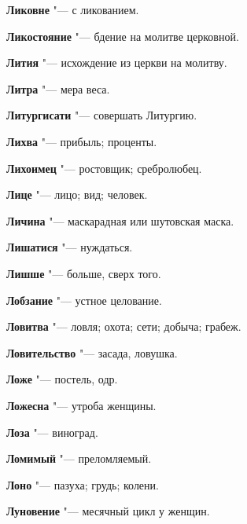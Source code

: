 \begin{mymulticols}{2}
\noindent\textbf{Ликовне} "--- с ликованием. 




\noindent\textbf{Ликостояние} "--- бдение на молитве церковной. 




\noindent\textbf{Лития} "--- исхождение из церкви на молитву. 




\noindent\textbf{Литра} "--- мера веса. 




\noindent\textbf{Литургисати} "--- совершать Литургию. 




\noindent\textbf{Лихва} "--- прибыль; проценты. 




\noindent\textbf{Лихоимец} "--- ростовщик; сребролюбец. 




\noindent\textbf{Лице} "--- лицо; вид; человек. 




\noindent\textbf{Личина} "--- маскарадная или шутовская маска. 




\noindent\textbf{Лишатися} "--- нуждаться. 




\noindent\textbf{Лишше} "--- больше, сверх того. 




\noindent\textbf{Лобзание} "--- устное целование. 




\noindent\textbf{Ловитва} "--- ловля; охота; сети; добыча; грабеж. 




\noindent\textbf{Ловительство} "--- засада, ловушка. 




\noindent\textbf{Ложе} "--- постель, одр. 




\noindent\textbf{Ложесна} "--- утроба женщины. 




\noindent\textbf{Лоза} "--- виноград. 




\noindent\textbf{Ломимый} "--- преломляемый. 




\noindent\textbf{Лоно} "--- пазуха; грудь; колени. 




\noindent\textbf{Луновение} "--- месячный цикл у женщин. 





\end{mymulticols}
